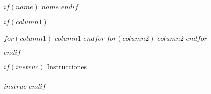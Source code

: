 \documentclass[letterpaper]{article}
\begin{document}
$if(name)$
  {\noindent \huge $name$}
  \vspace{1cm}
$endif$

$if(column1)$
  \begin{multicols}{2}
  \noindent 
  $for(column1)$
    $column1$\newline
  $endfor$
  $for(column2)$
    $column2$\newline
  $endfor$
  \end{multicols}
  \vspace{1cm}
$endif$

$if(instruc)$
  {\noindent \LARGE Instrucciones}\\
  \\
  \noindent  $instruc$
$endif$
\end{document}
